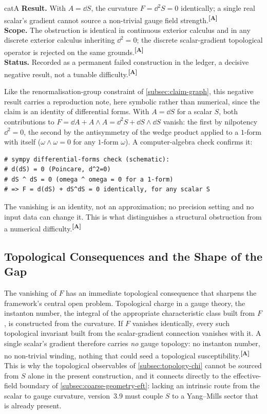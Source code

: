 \documentclass[12pt,a4paper,twoside]{article}
\theoremstyle{plain}
\theoremstyle{definition}
\theoremstyle{remark}
\newcommand{\catmark}[1]{\textsuperscript{\textsf{\textbf{[#1]}}}}
\begin{document}
\begin{evidencebox}[The $d^2 = 0$ Obstruction]{catA}
\textbf{Result.} With $A = \dd S$, the curvature $F = \dd^2 S = 0$ identically; a single real scalar's gradient cannot source a non-trivial gauge field
strength.\catmark{A}\\[0.3em]
\textbf{Scope.} The obstruction is identical in continuous exterior calculus and in any discrete exterior calculus inheriting $\dd^2 = 0$; the discrete scalar-gradient topological operator is rejected on the same
grounds.\catmark{A}\\[0.3em]
\textbf{Status.} Recorded as a permanent failed construction in the ledger, a decisive negative result, not a tunable difficulty.\catmark{A}
\end{evidencebox}

\noindent Like the renormalisation-group constraint of \cref{subsec:claim-graph}, this negative result carries a reproduction note, here symbolic rather than numerical, since the claim is an identity of differential forms. With $A=\dd S$ for a scalar $S$, both contributions to $F = \dd A + A\wedge A = \dd^2 S + \dd S \wedge \dd S$ vanish: the first by nilpotency $\dd^2=0$, the second by the antisymmetry of the wedge product applied to a $1$-form with itself ($\omega\wedge\omega=0$ for any $1$-form $\omega$). A computer-algebra check confirms it:
\begin{verbatim}
# sympy differential-forms check (schematic):
# d(dS) = 0 (Poincare, d^2=0)
# dS ^ dS = 0 (omega ^ omega = 0 for a 1-form)
# => F = d(dS) + dS^dS = 0 identically, for any scalar S
\end{verbatim}
The vanishing is an identity, not an approximation; no precision setting and no input data can change it. This is what distinguishes a structural obstruction from a numerical difficulty.\catmark{A}

\subsection{Topological Consequences and the Shape of the Gap}
\label{subsec:topological-consequences}

The vanishing of $F$ has an immediate topological consequence that sharpens the framework's central open problem. Topological charge in a gauge theory, the instanton number, the integral of the appropriate characteristic class built from $F$, is constructed from the curvature. If $F$ vanishes identically, every such topological invariant built from the scalar-gradient connection vanishes with it. A single scalar's gradient therefore carries \emph{no} gauge topology: no instanton number, no non-trivial winding, nothing that could seed a topological susceptibility.\catmark{A} This is why the topological observables of \cref{subsec:topology-chi} cannot be sourced from $S$ alone in the present construction, and it connects directly to the effective-field boundary of \cref{subsec:coarse-geometry-eft}: lacking an intrinsic route from the scalar to gauge curvature, version~3.9 must couple $S$ to a Yang--Mills sector that is already present.
\end{document}

